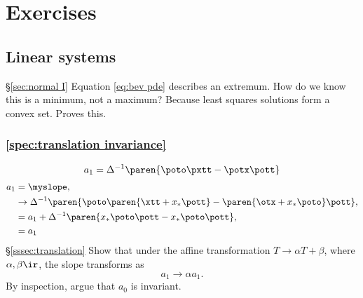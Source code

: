 \chapter{Exercises}   %

\section{Linear systems}  %

\S\ref{sec:normal I}
Equation \eqref{eq:bev pde} describes an extremum. How do we know this is a minimum, not a maximum? Because least squares solutions form a convex set. Proves this.

\subsection{\ref{spec:translation invariance}}  %
  \begin{equation*}   %
      a_{1} = \Delta^{-1} \paren{ \poto \pxtt - \potx \pott }
  \end{equation*}
  \begin{equation*}   %
    \begin{split}
      a_{1} &= \myslope, \\
            &\rightarrow \Delta^{-1} \paren{\poto \paren{\xtt + x_{*} \pott} - \paren{\otx + x_{*} \poto} \pott}, \\
            &= a_{1} + \Delta^{-1} \paren{x_{*} \poto \pott - x_{*}\poto\pott}, \\
            &= a_{1} 
    \end{split}
  \end{equation*}
\S\ref{sssec:translation}
Show that under the affine transformation $T\rightarrow \alpha T + \beta$, where $\alpha, \beta \ir$, the slope transforms as
  \begin{equation*}   %
      a_{1} \rightarrow \alpha a_{1}.
  \end{equation*}
By inspection, argue that $a_{0}$ is invariant.

\endinput